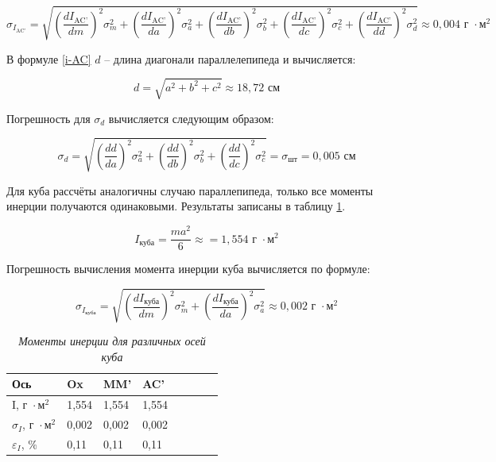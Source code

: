 \documentclass[a4paper, 12pt]{article}
\begin{document}
\begin{equation}\label{i-AC}
    \sigma_{I_{\text{AC'}}} = \sqrt{
    \left( \frac{dI_{\text{AC'}}}{dm} \right)^2 \sigma_{m}^2 + 
    \left( \frac{dI_{\text{AC'}}}{da} \right)^2 \sigma_{a}^2 + 
    \left( \frac{dI_{\text{AC'}}}{db} \right)^2 \sigma_{b}^2 + 
    \left( \frac{dI_{\text{AC'}}}{dc} \right)^2 \sigma_{c}^2 +
    \left( \frac{dI_{\text{AC'}}}{dd} \right)^2 \sigma_{d}^2
    } \approx 0,004 \text{ г } \cdot \text{м}^2
\end{equation}

В формуле \eqref{i-AC} $d$ -- длина диагонали параллелепипеда и вычисляется:

\begin{equation}
    d = \sqrt{a^2 + b^2 + c^2} \approx 18,72 \text{ см}
\end{equation}

 Погрешность для $\sigma_{d}$ вычисляется следующим образом:

\begin{equation}
    \sigma_{d} = \sqrt{
    \left( \frac{dd}{da} \right)^2 \sigma_{a}^2 + 
    \left( \frac{dd}{db} \right)^2 \sigma_{b}^2 + 
    \left( \frac{dd}{dc} \right)^2 \sigma_{c}^2
    } = \sigma_{\text{шт}} = 0,005 \text{ см}
\end{equation}

Для куба рассчёты аналогичны случаю параллепипеда, только все моменты инерции получаются одинаковыми. Результаты записаны в таблицу \ref{cube-i}.

\begin{equation}
    I_{\text{куба}} = \frac{ma^2}{6} \approx = 1,554 \text{ г } \cdot \text{м}^2
\end{equation}

Погрешность вычисления момента инерции куба вычисляется по формуле:

\begin{equation}
    \sigma_{I_{\text{куба}}} = \sqrt{
    \left( \frac{dI_{\text{куба}}}{dm} \right)^2 \sigma_{m}^2 + 
    \left( \frac{dI_{\text{куба}}}{da} \right)^2 \sigma_{a}^2
    } \approx 0,002 \text{ г } \cdot \text{м}^2
\end{equation}

\begin{table}[!ht]
    \centering
    \begin{tabular}{|l|l|l|l|l|l|l|l|}
    \hline
        Ось & Ox & MM' & AC' \\ \hline
        I, $\text{г } \cdot \text{м}^2$ & 1,554 & 1,554 & 1,554 \\ \hline
        $\sigma_{I}$, $\text{г } \cdot \text{м}^2$ & 0,002 & 0,002 & 0,002 \\ \hline
        $\varepsilon_{I}$, $\%$ & 0,11 & 0,11 & 0,11 \\ \hline
    \end{tabular}\caption{\textit{Моменты инерции для различных осей куба}}\label{cube-i}
\end{table}
\end{document}

